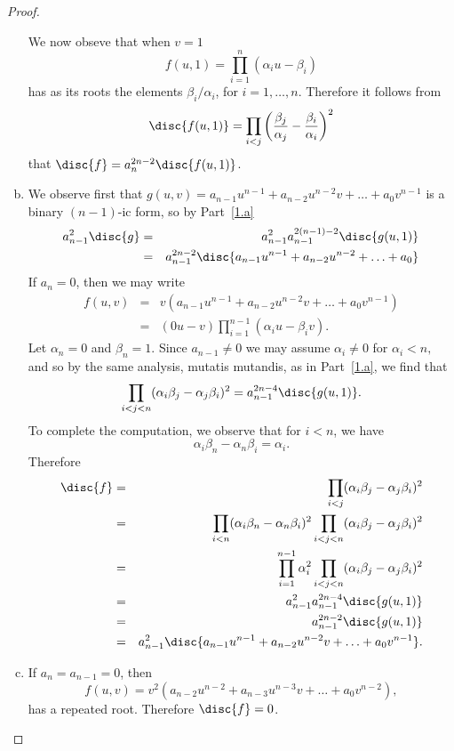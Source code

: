 \documentclass[10pt]{amsart}
\begin{document}
\begin{thm}
\begin{proof}
\begin{enumerate}[(a)]
      We now obseve that when $v = 1$
      $$f(u,1) = \prod_{i = 1}^n \left(\alpha_iu - \beta_i\right)$$
      has as its roots the elements $\beta_i/\alpha_i$, for $i = 1, \ldots, n$.
      Therefore it follows from 
      $$\disc{f(u,1)} = \prod_{i < j} \left(\frac{\beta_j}{\alpha_j} - \frac{\beta_i}{\alpha_i}\right)^2$$
      that $\disc{f} = a_n^{2n - 2}\disc{f(u,1)}$.
    \item
      We observe first that $g(u,v) = a_{n-1}u^{n-1} + a_{n-2}u^{n-2}v + \ldots + a_0v^{n-1}$ is a binary $(n-1)$-ic form, so by Part~\ref{1.a}
      \begin{eqnarray*}
        a_{n-1}^2 \disc{g} &=& a_{n-1}^2 a_{n-1}^{2(n-1)-2} \disc{g(u,1)}\\
        &=& a_{n-1}^{2n-2} \disc{a_{n-1}u^{n-1} + a_{n-2}u^{n-2} + \ldots + a_0}
      \end{eqnarray*}
      If $a_n = 0$, then we may write
      \begin{eqnarray*}
        f(u,v) &=& v\left(a_{n-1}u^{n-1} + a_{n-2}u^{n-2}v + \ldots + a_0v^{n-1}\right)\\
        &=& (0u - v)\prod_{i = 1}^{n-1} (\alpha_i u - \beta_i v).
      \end{eqnarray*}
      Let $\alpha_n = 0$ and $\beta_n = 1$.
      Since $a_{n-1} \neq 0$ we may assume $\alpha_i \neq 0$ for $\alpha_i < n,$ and so by the same analysis, mutatis mutandis, as in Part~\ref{1.a}, we find that
      $$\prod_{i < j < n}(\alpha_i\beta_j - \alpha_j\beta_i)^2 = a_{n-1}^{2n - 4}\disc{g(u,1)}.$$
      To complete the computation, we observe that for $i < n$, we have
      $$\alpha_i\beta_n -\alpha_n\beta_i = \alpha_i.$$
      Therefore
      \begin{eqnarray*}
        \disc{f} &=& \prod_{i < j}(\alpha_i\beta_j - \alpha_j\beta_i)^2\\
        &=& \prod_{i < n} (\alpha_i\beta_n - \alpha_n\beta_i)^2\prod_{i < j < n}(\alpha_i\beta_j - \alpha_j\beta_i)^2\\
        &=& \prod_{i = 1}^{n-1} \alpha_i^2\prod_{i < j < n}(\alpha_i\beta_j - \alpha_j\beta_i)^2\\
        &=& a_{n-1}^2 a_{n-1}^{2n - 4}\disc{g(u,1)}\\
        &=& a_{n-1}^{2n - 2}\disc{g(u,1)}\\
        &=& a_{n-1}^2 \disc{a_{n-1}u^{n-1} + a_{n-2}u^{n-2}v + \ldots + a_0v^{n-1}}.
      \end{eqnarray*}
    \item
      If $a_n = a_{n-1} = 0$, then 
      $$f(u,v) = v^2\left(a_{n-2}u^{n-2} + a_{n-3}u^{n-3}v + \ldots + a_0v^{n-2}\right),$$
      has a repeated root.
      Therefore $\disc{f} = 0$.
      
    \end{enumerate}
  \end{proof}
\end{thm}
\end{document}
